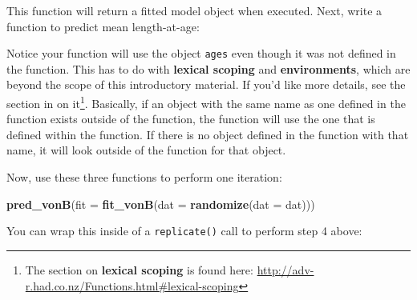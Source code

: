 \documentclass[]{book}
\newenvironment{Shaded}{\begin{snugshade}}{\end{snugshade}}
\newcommand{\KeywordTok}[1]{\textcolor[rgb]{0.13,0.29,0.53}{\textbf{#1}}}
\newcommand{\DataTypeTok}[1]{\textcolor[rgb]{0.13,0.29,0.53}{#1}}
\newcommand{\DecValTok}[1]{\textcolor[rgb]{0.00,0.00,0.81}{#1}}
\newcommand{\StringTok}[1]{\textcolor[rgb]{0.31,0.60,0.02}{#1}}
\newcommand{\CommentTok}[1]{\textcolor[rgb]{0.56,0.35,0.01}{\textit{#1}}}
\newcommand{\ControlFlowTok}[1]{\textcolor[rgb]{0.13,0.29,0.53}{\textbf{#1}}}
\newcommand{\OperatorTok}[1]{\textcolor[rgb]{0.81,0.36,0.00}{\textbf{#1}}}
\newcommand{\NormalTok}[1]{#1}
\let\rmarkdownfootnote\footnote%
\def\footnote{\protect\rmarkdownfootnote}
\theoremstyle{definition}
\theoremstyle{definition}
\theoremstyle{definition}
\theoremstyle{remark}
\begin{document}
This function will return a fitted model object when executed. Next,
write a function to predict mean length-at-age:

\begin{Shaded}
\end{Shaded}

Notice your function will use the object \texttt{ages} even though it
was not defined in the function. This has to do with \textbf{lexical
scoping} and \textbf{environments}, which are beyond the scope of this
introductory material. If you'd like more details, see the section in
\citet{adv-r-cite} on it\footnote{The section on \textbf{lexical
  scoping} is found here:
  \url{http://adv-r.had.co.nz/Functions.html\#lexical-scoping}}.
Basically, if an object with the same name as one defined in the
function exists outside of the function, the function will use the one
that is defined within the function. If there is no object defined in
the function with that name, it will look outside of the function for
that object.

Now, use these three functions to perform one iteration:

\begin{Shaded}
\begin{Highlighting}[]
\KeywordTok{pred_vonB}\NormalTok{(}\DataTypeTok{fit =} \KeywordTok{fit_vonB}\NormalTok{(}\DataTypeTok{dat =} \KeywordTok{randomize}\NormalTok{(}\DataTypeTok{dat =}\NormalTok{ dat)))}
\end{Highlighting}
\end{Shaded}

You can wrap this inside of a \texttt{replicate()} call to perform step
4 above:
\end{document}
